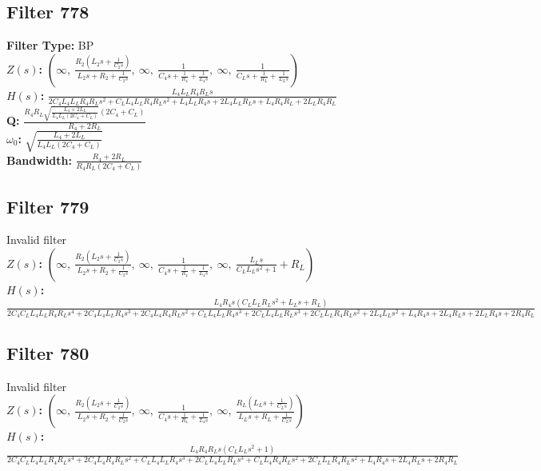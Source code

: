 \documentclass{article}
\begin{document}
\subsection*{Filter 778}
\textbf{Filter Type:} BP \\ 
\textbf{$Z(s)$:} $\left( \infty, \  \frac{R_{2} \left(L_{2} s + \frac{1}{C_{2} s}\right)}{L_{2} s + R_{2} + \frac{1}{C_{2} s}}, \  \infty, \  \frac{1}{C_{4} s + \frac{1}{R_{4}} + \frac{1}{L_{4} s}}, \  \infty, \  \frac{1}{C_{L} s + \frac{1}{R_{L}} + \frac{1}{L_{L} s}}\right)$ \\ 
\textbf{$H(s)$:} $\frac{L_{4} L_{L} R_{4} R_{L} s}{2 C_{4} L_{4} L_{L} R_{4} R_{L} s^{2} + C_{L} L_{4} L_{L} R_{4} R_{L} s^{2} + L_{4} L_{L} R_{4} s + 2 L_{4} L_{L} R_{L} s + L_{4} R_{4} R_{L} + 2 L_{L} R_{4} R_{L}}$ \\ 
\textbf{Q:} $\frac{R_{4} R_{L} \sqrt{\frac{L_{4} + 2 L_{L}}{L_{4} L_{L} \left(2 C_{4} + C_{L}\right)}} \left(2 C_{4} + C_{L}\right)}{R_{4} + 2 R_{L}}$ \\ 
\textbf{$\omega_0$:} $\sqrt{\frac{L_{4} + 2 L_{L}}{L_{4} L_{L} \left(2 C_{4} + C_{L}\right)}}$ \\ 
\textbf{Bandwidth:} $\frac{R_{4} + 2 R_{L}}{R_{4} R_{L} \left(2 C_{4} + C_{L}\right)}$ \\ 
\subsection*{Filter 779}
Invalid filter \\ 
\textbf{$Z(s)$:} $\left( \infty, \  \frac{R_{2} \left(L_{2} s + \frac{1}{C_{2} s}\right)}{L_{2} s + R_{2} + \frac{1}{C_{2} s}}, \  \infty, \  \frac{1}{C_{4} s + \frac{1}{R_{4}} + \frac{1}{L_{4} s}}, \  \infty, \  \frac{L_{L} s}{C_{L} L_{L} s^{2} + 1} + R_{L}\right)$ \\ 
\textbf{$H(s)$:} $\frac{L_{4} R_{4} s \left(C_{L} L_{L} R_{L} s^{2} + L_{L} s + R_{L}\right)}{2 C_{4} C_{L} L_{4} L_{L} R_{4} R_{L} s^{4} + 2 C_{4} L_{4} L_{L} R_{4} s^{3} + 2 C_{4} L_{4} R_{4} R_{L} s^{2} + C_{L} L_{4} L_{L} R_{4} s^{3} + 2 C_{L} L_{4} L_{L} R_{L} s^{3} + 2 C_{L} L_{L} R_{4} R_{L} s^{2} + 2 L_{4} L_{L} s^{2} + L_{4} R_{4} s + 2 L_{4} R_{L} s + 2 L_{L} R_{4} s + 2 R_{4} R_{L}}$ \\ 
\subsection*{Filter 780}
Invalid filter \\ 
\textbf{$Z(s)$:} $\left( \infty, \  \frac{R_{2} \left(L_{2} s + \frac{1}{C_{2} s}\right)}{L_{2} s + R_{2} + \frac{1}{C_{2} s}}, \  \infty, \  \frac{1}{C_{4} s + \frac{1}{R_{4}} + \frac{1}{L_{4} s}}, \  \infty, \  \frac{R_{L} \left(L_{L} s + \frac{1}{C_{L} s}\right)}{L_{L} s + R_{L} + \frac{1}{C_{L} s}}\right)$ \\ 
\textbf{$H(s)$:} $\frac{L_{4} R_{4} R_{L} s \left(C_{L} L_{L} s^{2} + 1\right)}{2 C_{4} C_{L} L_{4} L_{L} R_{4} R_{L} s^{4} + 2 C_{4} L_{4} R_{4} R_{L} s^{2} + C_{L} L_{4} L_{L} R_{4} s^{3} + 2 C_{L} L_{4} L_{L} R_{L} s^{3} + C_{L} L_{4} R_{4} R_{L} s^{2} + 2 C_{L} L_{L} R_{4} R_{L} s^{2} + L_{4} R_{4} s + 2 L_{4} R_{L} s + 2 R_{4} R_{L}}$ \\ 
\end{document}
